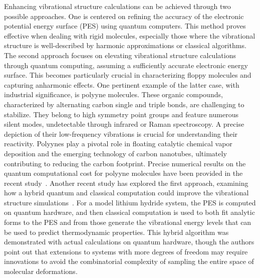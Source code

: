 Enhancing vibrational structure calculations can be achieved through two possible approaches. One is centered on refining the accuracy of the electronic potential energy surface (PES) using quantum computers. This method proves effective when dealing with rigid molecules, especially those where the vibrational structure is well-described by harmonic approximations or classical algorithms. The second approach focuses on elevating vibrational structure calculations through quantum computing, assuming a sufficiently accurate electronic energy surface. This becomes particularly crucial in characterizing floppy molecules and capturing anharmonic effects.
One pertinent example of the latter case, with industrial significance, is polyyne molecules. These organic compounds, characterized by alternating carbon single and triple bonds, are challenging to stabilize. They belong to high symmetry point groups and feature numerous silent modes, undetectable through infrared or Raman spectroscopy. A precise depiction of their low-frequency vibrations is crucial for understanding their reactivity. Polyynes play a pivotal role in floating catalytic chemical vapor deposition and the emerging technology of carbon nanotubes, ultimately contributing to reducing the carbon footprint. Precise numerical results on the quantum computational cost for polyyne molecules have been provided in the recent study~\cite{VibResourceEstimate_IBM2023}.
%
Another recent study has explored the first approach, examining how a hybrid quantum and classical computation could improve the vibrational structure simulations~\cite{StoberPRA2022}. For a model lithium hydride system, the PES is computed on quantum hardware, and then classical computation is used to both fit analytic forms to the PES and from those generate the vibrational energy levels that can be used to predict thermodynamic properties.  This hybrid algorithm was demonstrated with actual calculations on quantum hardware, though the authors point out that extensions to systems with more degrees of freedom may require innovations to avoid the combinatorial complexity of sampling the entire space of molecular deformations.

